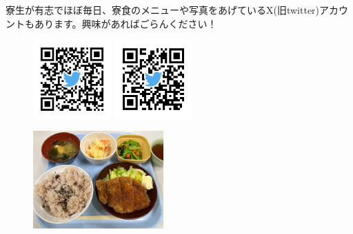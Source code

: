   


寮生が有志でほぼ毎日、寮食のメニューや写真をあげているX(旧twitter)アカウントもあります。興味があればごらんください！

\begin{figure}[h]
  \begin{minipage}[b]{0.5\textwidth}
    \centering
    \includegraphics[width=3cm]{gazo/QR_ryoshoku_bot.png}
  \end{minipage}
  \begin{minipage}[b]{0.5\textwidth}
    \centering
    \includegraphics[width=3cm]{gazo/QR_ajiri.png}
  \end{minipage}
\end{figure}


\begin{figure}[H]
  \centering
  \includegraphics[width=5cm]{gazo/sekihan.pdf}
\end{figure}